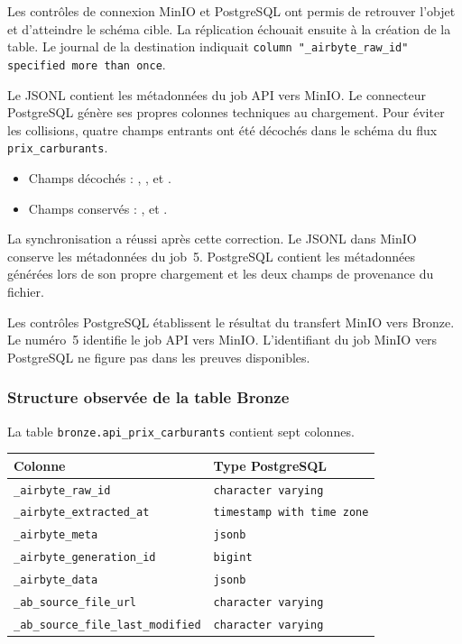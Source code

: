 \documentclass[11pt,a4paper]{article}
\newcommand{\code}[1]{\texttt{#1}}
\begin{document}
Les contrôles de connexion MinIO et PostgreSQL ont permis de retrouver
l'objet et d'atteindre le schéma cible. La réplication échouait ensuite
à la création de la table. Le journal de la destination indiquait
\verb|column "_airbyte_raw_id" specified more than once|.

Le JSONL contient les métadonnées du job API vers MinIO. Le connecteur
PostgreSQL génère ses propres colonnes techniques au chargement.
Pour éviter les collisions, quatre champs entrants ont été décochés
dans le schéma du flux \code{prix\_carburants}.

\begin{itemize}
  \item Champs décochés : ,
        ,  et
        .
  \item Champs conservés : ,
         et
        .
\end{itemize}

La synchronisation a réussi après cette correction. Le JSONL dans
MinIO conserve les métadonnées du job~5. PostgreSQL contient les
métadonnées générées lors de son propre chargement et les deux champs
de provenance du fichier.

Les contrôles PostgreSQL établissent le résultat du transfert
MinIO vers Bronze. Le numéro~5 identifie le job API vers MinIO.
L'identifiant du job MinIO vers PostgreSQL ne figure pas dans les
preuves disponibles.

\subsubsection{Structure observée de la table Bronze}

La table \code{bronze.api\_prix\_carburants} contient sept colonnes.

{\small
\begin{tabularx}{\linewidth}{@{}l X@{}}
\toprule
Colonne & Type PostgreSQL \\
\midrule
\code{\_airbyte\_raw\_id} & \code{character varying} \\
\code{\_airbyte\_extracted\_at} & \code{timestamp with time zone} \\
\code{\_airbyte\_meta} & \code{jsonb} \\
\code{\_airbyte\_generation\_id} & \code{bigint} \\
\code{\_airbyte\_data} & \code{jsonb} \\
\code{\_ab\_source\_file\_url} & \code{character varying} \\
\code{\_ab\_source\_file\_last\_modified} & \code{character varying} \\
\bottomrule
\end{tabularx}
}
\end{document}
